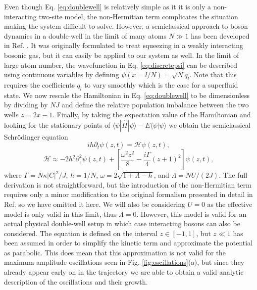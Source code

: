 Even though Eq. \eqref{eq:doublewell} is relatively simple as it it is
only a non-interacting two-site model, the non-Hermitian term
complicates the situation making the system difficult to
solve. However, a semiclassical approach to boson dynamics in a
double-well in the limit of many atoms $N \gg 1$ has been developed in
Ref. \cite{juliadiaz2012}. It was originally formulated to treat
squeezing in a weakly interacting bosonic gas, but it can easily be
applied to our system as well. In the limit of large atom number, the
wavefunction in Eq. \eqref{eq:discretepsi} can be described using
continuous variables by defining $\psi (x = l / N) = \sqrt{N}
q_l$. Note that this requires the coefficients $q_l$ to vary smoothly
which is the case for a superfluid state. We now rescale the
Hamiltonian in Eq. \eqref{eq:doublewell} to be dimensionless by
dividing by $NJ$ and define the relative population imbalance between
the two wells $z = 2x - 1$. Finally, by taking the expectation value
of the Hamiltonian and looking for the stationary points of
$\langle \psi | \hat{H} | \psi \rangle - E \langle \psi | \psi
\rangle$ we obtain the semiclassical Schr\"{o}dinger equation
\begin{equation}
  \label{eq:semicl}
  i h \partial_t \psi(z, t) = \mathcal{H} \psi(z, t),
\end{equation}
\begin{equation}
  \label{eq:semiH}
  \mathcal{H} \approx -2 h^2 \partial^2_z \psi(z, t) + \left[
    \frac{\omega^2 z^2} {8} - \frac{i \Gamma} {4} \left( z + 1
    \right)^2 \right] \psi(z, t),
\end{equation}
where $\Gamma = N \kappa |C|^2 / J$, $h = 1/N$,
$\omega = 2 \sqrt{1 + \Lambda - h}$, and $\Lambda = NU / (2J)$. The
full derivation is not straightforward, but the introduction of the
non-Hermitian term requires only a minor modification to the original
formalism presented in detail in Ref. \cite{juliadiaz2012} so we have
omitted it here. We will also be considering $U = 0$ as the effective
model is only valid in this limit, thus $\Lambda = 0$. However, this
model is valid for an actual physical double-well setup in which case
interacting bosons can also be considered. The equation is defined on
the interval $z \in [-1, 1]$, but $z \ll 1$ has been assumed in order
to simplify the kinetic term and approximate the potential as
parabolic. This does mean that this approximation is not valid for the
maximum amplitude oscillations seen in Fig. \ref{fig:oscillations}(a),
but since they already appear early on in the trajectory we are able
to obtain a valid analytic description of the oscillations and their
growth.

